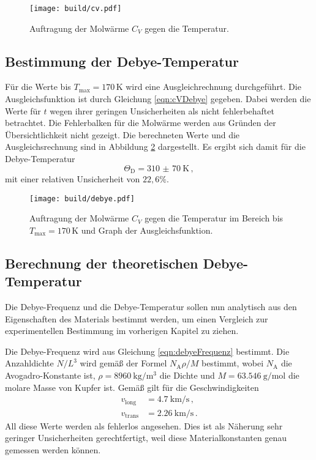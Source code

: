 \begin{figure}
  \centering
  \texttt{[image: build/cv.pdf]}
  \caption{Auftragung der Molwärme $C_V$ gegen die Temperatur.}
  \label{fig:cv}
\end{figure}

\subsection{Bestimmung der Debye-Temperatur}
\label{subsec:debye}

Für die Werte bis $T_{\text{max}}=170$\,K wird eine Ausgleichrechnung durchgeführt. Die Ausgleichsfunktion ist durch Gleichung \eqref{eqn:cVDebye} gegeben.
Dabei werden die Werte für $t$ wegen ihrer geringen Unsicherheiten als nicht fehlerbehaftet betrachtet.
Die Fehlerbalken für die Molwärme werden aus Gründen der Übersichtlichkeit nicht gezeigt.
Die berechneten Werte und die Ausgleichsrechnung sind in Abbildung \ref{fig:debye} dargestellt.
Es ergibt sich damit für die Debye-Temperatur
\begin{equation*}
  \Theta_\text{D}=\SI{310(70)}{\kelvin} \,,
\end{equation*}
mit einer relativen Unsicherheit von $22{,}6\%$.

\begin{figure}
  \centering
  \texttt{[image: build/debye.pdf]}
  \caption{Auftragung der Molwärme $C_V$ gegen die Temperatur im Bereich bis
  $T_{\text{max}}=170$\,K und Graph der Ausgleichsfunktion.}
  \label{fig:debye}
\end{figure}

\subsection{Berechnung der theoretischen Debye-Temperatur}
\label{subsec:debyetheo}

Die Debye-Frequenz und die Debye-Temperatur sollen nun analytisch aus den Eigenschaften des Materials bestimmt werden, um einen Vergleich zur experimentellen Bestimmung im vorherigen Kapitel zu ziehen.

Die Debye-Frequenz wird aus Gleichung \eqref{eqn:debyeFrequenz} bestimmt.
Die Anzahldichte $N/L^3$ wird gemäß der Formel $N_\text{A} \rho / M$ bestimmt, wobei $N_\text{A}$ die Avogadro-Konstante ist,
$\rho = \SI{8960}{\kilo\gram\per\cubic\meter}$ \cite{density} die Dichte und $M = \SI{63.546}{\gram\per\mole}$ \cite{Molmasse} die molare Masse von Kupfer ist.
Gemäß \cite{versuchsanleitung} gilt für die Geschwindigkeiten
\begin{align*}
  v_{\text{long}}&= \SI{4.7}{\kilo\metre\per\second} \,,\\
  v_{\text{trans}}&=\SI{2.26}{\kilo\metre\per\second} \,.
\end{align*}
All diese Werte werden als fehlerlos angesehen. Dies ist als Näherung sehr geringer Unsicherheiten gerechtfertigt, weil diese Materialkonstanten genau gemessen werden können.

